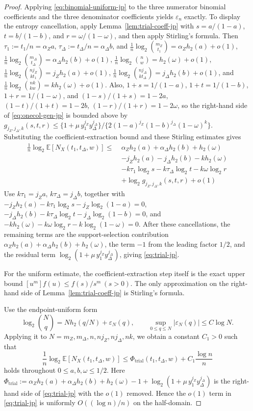 \documentclass[11pt]{article}
\theoremstyle{definition}
\newcommand{\EE}{\mathbb E}
\newcommand{\h}{h_2}
\newcommand{\NX}{N_X}
\begin{document}
\begin{proof}
Applying \eqref{eq:binomial-uniform-jp} to the three numerator
binomial coefficients and the three denominator coefficients yields
\(\varepsilon_n\) exactly. To display the entropy cancellation, apply
Lemma~\ref{lem:trial-coeff-jp} with
\(s=a/(1-a)\), \(t=b/(1-b)\), and \(r=\omega/(1-\omega)\), and then apply Stirling's formula. Then
\(\tau_1:=t_1/n=\alpha_Za\), \(\tau_\Delta:=t_\Delta/n=\alpha_\Delta b\), and
\(\frac1n\log_2\binom{m_Z}{t_1}=\alpha_Z\h(a)+o(1)\),
\(\frac1n\log_2\binom{m_\Delta}{t_\Delta}=\alpha_\Delta\h(b)+o(1)\),
\(\frac1n\log_2\binom{n}{w}=\h(\omega)+o(1)\),
\(\frac1n\log_2\binom{n j_Z}{kt_1}=j_Z\h(a)+o(1)\),
\(\frac1n\log_2\binom{n j_\Delta}{kt_\Delta}=j_\Delta\h(b)+o(1)\), and
\(\frac1n\log_2\binom{nk}{kw}=k\h(\omega)+o(1)\).
Also, \(1+s=1/(1-a)\), \(1+t=1/(1-b)\), \(1+r=1/(1-\omega)\), and \((1-s)/(1+s)=1-2a\), \((1-t)/(1+t)=1-2b\), \((1-r)/(1+r)=1-2\omega\), so the right-hand side of \eqref{eq:onecol-gen-jp} is bounded above by
\(g_{j_Z,j_\Delta,k}(s,t,r)\le \{1+\mu\, y_1^{j_Z}y_\Delta^{j_\Delta}\}/\{2(1-a)^{j_Z}(1-b)^{j_\Delta}(1-\omega)^k\}\).
Substituting the coefficient-extraction bound and these Stirling estimates gives
\begin{equation*}
\begin{aligned}
\frac1n\log_2 \EE[\NX(t_1,t_\Delta,w)]
\le\;&
\alpha_Z\h(a)+\alpha_\Delta\h(b)+\h(\omega) \\
&-j_Z\h(a)-j_\Delta\h(b)-k\h(\omega) \\
&-k\tau_1\log_2 s-k\tau_\Delta\log_2 t-k\omega\log_2 r \\
&+\log_2 g_{j_Z,j_\Delta,k}(s,t,r)+o(1)
\end{aligned}
\end{equation*}
Use \(k\tau_1=j_Za\), \(k\tau_\Delta=j_\Delta b\), together with
\(-j_Z\h(a)-k\tau_1\log_2 s-j_Z\log_2(1-a)=0\),
\(-j_\Delta\h(b)-k\tau_\Delta\log_2 t-j_\Delta\log_2(1-b)=0\), and
\(-k\h(\omega)-k\omega\log_2 r-k\log_2(1-\omega)=0\).
After these cancellations, the remaining terms are the support-selection contribution \(\alpha_Z\h(a)+\alpha_\Delta\h(b)+\h(\omega)\), the term \(-1\) from the leading factor \(1/2\), and the residual term \(\log_2(1+\mu\, y_1^{j_Z}y_\Delta^{j_\Delta})\), giving \eqref{eq:trial-jp}.

For the uniform estimate, the coefficient-extraction step itself is the exact upper bound \([u^m]f(u)\le f(s)/s^m\ (s>0)\). The only approximation on the right-hand side of Lemma~\ref{lem:trial-coeff-jp} is Stirling's formula.

Use the endpoint-uniform form
\[
\log_2\binom{N}{q}=N\h(q/N)+\varepsilon_N(q),
\qquad
\sup_{0\le q\le N}|\varepsilon_N(q)|\le C\log N.
\]
Applying it to \(N=m_Z,m_\Delta,n,nj_Z,nj_\Delta,nk\), we obtain a constant \(C_1>0\) such that
\[
\frac1n\log_2 \EE[\NX(t_1,t_\Delta,w)]
\le
\Phi_{\mathrm{trial}}(t_1,t_\Delta,w)+
C_1\frac{\log n}{n}
\]
holds throughout \(0\le a,b,\omega\le 1/2\). Here \(\Phi_{\mathrm{trial}}:=\alpha_Z\h(a)+\alpha_\Delta\h(b)+\h(\omega)-1+\log_2(1+\mu\, y_1^{j_Z}y_\Delta^{j_\Delta})\) is the right-hand side of \eqref{eq:trial-jp} with the \(o(1)\) removed. Hence the \(o(1)\) term in \eqref{eq:trial-jp} is uniformly \(O((\log n)/n)\) on the half-domain.
\end{proof}
\end{document}
